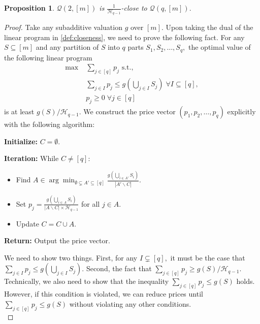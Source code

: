 \documentclass[11pt]{article}%
\newtheorem{proposition}[theorem]{Proposition}
\numberwithin{theorem}{subsection}
\newcommand{\classqm}{\mathcal{Q}(q,[m])}
\begin{document}
\noindent
\begin{proposition}
\label{lem:qparttosa}
 $\mathcal{Q}(2,[m])$ is $\frac{1}{\mathcal{H}_{q-1}}$-close to $\classqm.$
\end{proposition}
\begin{proof} Take any subadditive valuation $g$ over $[m].$ Upon taking the dual of the linear program in \cref{def:closeness}, we need to prove the following fact. For any $S\subseteq [m]$ and any partition of $S$ into $q$ parts $S_1, S_2, \ldots, S_q,$ the optimal value of the following linear program 
\begin{equation*}
    \begin{split}
        \max \; &\sum_{j \in [q]} p_j \text{ s.t.,}\\
        &\sum_{j \in I}p_j\le g(\bigcup_{j \in I}S_j)\; \forall  I\subseteq [q],\\
        &p_j\ge 0 \; \forall j \in [q]
    \end{split}
\end{equation*}
is at least $g(S)/\mathcal{H}_{q-1}.$ We construct the price vector $(p_1, p_2, \ldots, p_q)$ explicitly with the following algorithm:
\begin{tcolorbox}[colback=black!5!white,colframe=black!75!black, title = {Algorithm for Constructing Price Vectors}]
\textbf{Initialize:} $C = \emptyset.$

\noindent
\textbf{Iteration:} While $C\neq [q]:$
\begin{itemize}
    \item Find $\displaystyle A \in  \arg \min_{\emptyset \subsetneq A'\subseteq [q]}\frac{g(\bigcup_{i\in A'}S_i)}{|A'\backslash C|}.$
    \item Set $p_j = \frac{g(\bigcup_{i\in A}S_i)}{|A\backslash C|\times \mathcal{H}_{q-1}}$ for all $j \in A.$
    \item Update $C = C\cup A.$
\end{itemize}

\noindent
\textbf{Return:} Output the price vector.  
\end{tcolorbox}

\noindent
We need to show two things. First, for any $I\subsetneq [q],$ it must be the case that $\sum_{j \in I}p_j\le g(\bigcup_{j \in I}S_j).$ Second, the fact that $\sum_{j \in [q]}p_j\ge g(S)/\mathcal{H}_{q-1}.$ Technically, we also need to show that the inequality $\sum_{j \in [q]}p_j\le g(S)$ holds. However, if this condition is violated, we can reduce prices until $\sum_{j \in [q]}p_j\le g(S)$ without violating any other conditions.\\


\end{proof}
\end{document}
